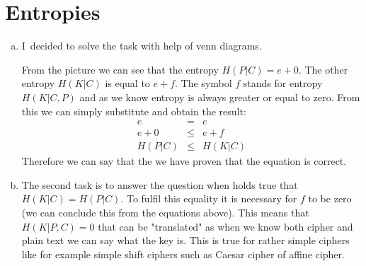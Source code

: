 \documentclass[a4paper,10pt]{article}
\def\firstcircle{(270:1.75cm) circle (2.5cm)}
\def\secondcircle{(150:1.75cm) circle (2.5cm)}
\def\thirdcircle{(30:1.75cm) circle (2.5cm)}
\begin{document}
\section*{Entropies}
\begin{enumerate}[a)]
\item I~decided to solve the task with help of venn diagrams.

\begin{figure}[h!]
\centering
\end{figure}

From the picture we can see that the entropy $ H(P|C) = e + 0 $. The other entropy $H(K|C)$ is equal to $e+f$. The symbol $f$ stands for entropy $H(K|C,P)$ and as we know entropy is always greater or equal to zero. From this we can simply substitute and obtain the result:
\begin{eqnarray*}
e &=& e\\
e + 0 &\leq & e + f\\
H(P|C) &\leq & H(K|C)
\end{eqnarray*}
Therefore we can say that the we have proven that the equation is correct.


\item The second task is to answer the question when holds true that $H(K|C) = H(P|C)$. To fulfil this equality it is necessary for $f$ to be zero (we can conclude this from the equations above). This means that $H(K|P,C)=0$ that can be "translated" as when we know both cipher and plain text  we can say what the key is. This is true for rather simple ciphers like for example simple shift ciphers such as Caesar cipher of affine cipher.
\end{enumerate}
\end{document}
